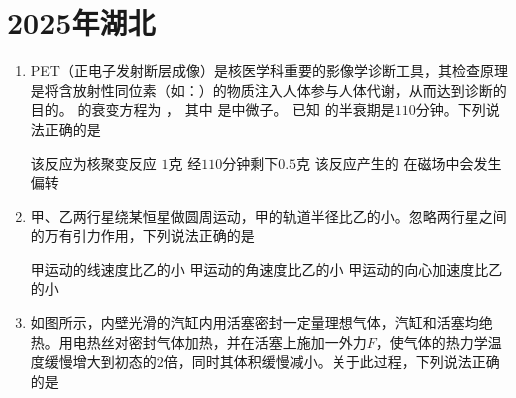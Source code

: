 \chapter{2025年湖北}

\begin{enumerate}
\item
PET（正电子发射断层成像）是核医学科重要的影像学诊断工具，其检查原理是将含放射性同位素（如：）的物质注入人体参与人体代谢，从而达到诊断的目的。
的衰变方程为
，
其中 是中微子。
已知 的半衰期是$110$分钟。下列说法正确的是 

{该反应为核聚变反应}
{$1$克 经$110$分钟剩下$0.5$克 }
{该反应产生的 在磁场中会发生偏转}


\item
甲、乙两行星绕某恒星做圆周运动，甲的轨道半径比乙的小。忽略两行星之间的万有引力作用，下列说法正确的是  

{甲运动的线速度比乙的小}
{甲运动的角速度比乙的小}
{甲运动的向心加速度比乙的小}



\item 
如图所示，内壁光滑的汽缸内用活塞密封一定量理想气体，汽缸和活塞均绝热。用电热丝对密封气体加热，并在活塞上施加一外力$F$，使气体的热力学温度缓慢增大到初态的$2$倍，同时其体积缓慢减小。关于此过程，下列说法正确的是  



\end{enumerate}
